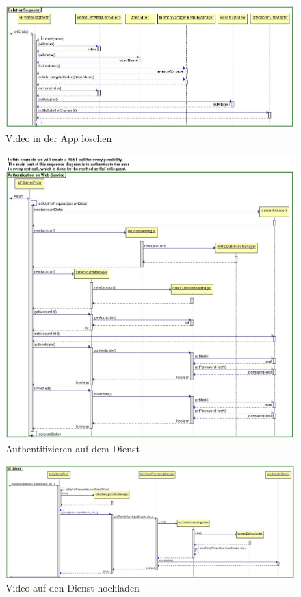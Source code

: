 \begin{figure}[ht]
	\centering
\includegraphics[width=1\textwidth]{./resources/Diagramme/App/deleteVideoSequence.jpg}
\caption{Video in der App löschen}
	\label{fig:AppDel}
\end{figure}

\begin{figure}[ht]
	\centering
\includegraphics[width=1\textwidth]{./resources/Diagramme/Webservice/SeqAuthenticate.jpg}
\caption{Authentifizieren auf dem Dienst}
	\label{fig:ServiceAuth}
\end{figure}

\begin{figure}[ht]
	\centering
\includegraphics[width=1\textwidth]{./resources/Diagramme/Webservice/Upload.jpg}
\caption{Video auf den Dienst hochladen}
	\label{fig:ServiceUpload}
\end{figure}

